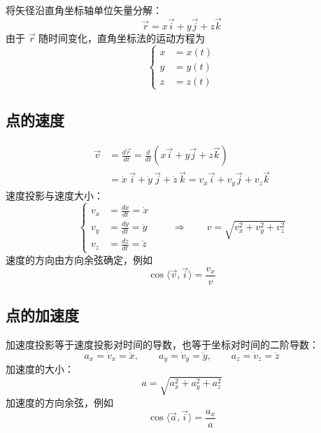 将矢径沿直角坐标轴单位矢量分解：
\begin{equation}
  \vec{r} = x\vec{i} + y\vec{j} + z\vec{k}
  \label{eq:6-r-xyz}
\end{equation}
由于 $\vec{r}$ 随时间变化，直角坐标法的运动方程为
\begin{equation}
  \left\{\begin{aligned}
    x &= x(t) \\
    y &= y(t) \\
    z &= z(t)
  \end{aligned}\right.
  \label{eq:6-motion-xyz}
\end{equation}

\subsection{点的速度}

\begin{equation}
  \begin{aligned}
    \vec{v} &= \frac{d\vec{r}}{dt}
             = \frac{d}{dt}\left(x\vec{i} + y\vec{j} + z\vec{k}\right) \\
            &= \dot{x}\,\vec{i} + \dot{y}\,\vec{j} + \dot{z}\,\vec{k}
             = v_x\vec{i} + v_y\vec{j} + v_z\vec{k}
  \end{aligned}
  \label{eq:6-v-xyz}
\end{equation}
速度投影与速度大小：
\begin{equation}
  \left\{\begin{aligned}
    v_x &= \frac{dx}{dt} = \dot{x} \\
    v_y &= \frac{dy}{dt} = \dot{y} \\
    v_z &= \frac{dz}{dt} = \dot{z}
  \end{aligned}\right.
  \qquad\Longrightarrow\qquad
  v = \sqrt{v_x^2 + v_y^2 + v_z^2}
  \label{eq:6-v-mod}
\end{equation}
速度的方向由方向余弦确定，例如
\begin{equation}
  \cos\langle \vec{v},\vec{i}\rangle = \frac{v_x}{v}
  \label{eq:6-v-dir}
\end{equation}

\subsection{点的加速度}

加速度投影等于速度投影对时间的导数，也等于坐标对时间的二阶导数：
\begin{equation}
  a_x = \dot{v}_x = \ddot{x}, \qquad
  a_y = \dot{v}_y = \ddot{y}, \qquad
  a_z = \dot{v}_z = \ddot{z}
  \label{eq:6-a-xyz}
\end{equation}
加速度的大小：
\begin{equation}
  a = \sqrt{a_x^2 + a_y^2 + a_z^2}
  \label{eq:6-a-mod}
\end{equation}
加速度的方向余弦，例如
\begin{equation}
  \cos\langle \vec{a},\vec{i}\rangle = \frac{a_x}{a}
  \label{eq:6-a-dir}
\end{equation}


